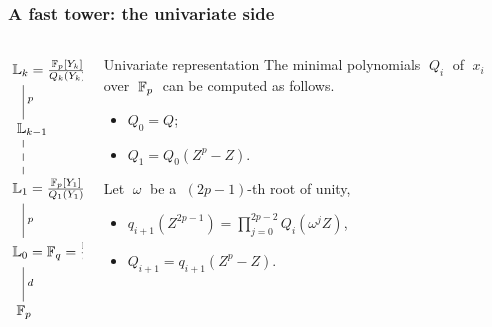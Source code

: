 \documentclass[10pt]{beamer}
\begin{document}
\begin{frame}
  \frametitle{A fast tower: the univariate side}

  \vspace{-2mm}

  \begin{columns}
    \begin{column}{0.3\textwidth}
      \Large$\xymatrix{
        *+[r]{\LK_k = \frac{\F_p[Y_k]}{Q_k(Y_k)}}\ar@{-}[d]^p\\
        *+[r]{\LK_{k-1}} \ar@{--}[d]\\
        *+[r]{\LK_1 = \frac{\F_p[Y_1]}{Q_1(Y_1)}} \ar@{-}[d]^p\\
        *+[r]{\LK_0 = \F_q = \frac{\F_p[X_0]}{Q(X_0)}} \ar@{-}[d]^d\\
        *+[r]{\F_p}
      }$    
    \end{column}
    \begin{column}{0.65\textwidth}
      \begin{block}{Univariate representation}
        The minimal polynomials $\;Q_i\;$ of $\;x_i\;$ over $\;\mathbb{F}_p\;$
        can be computed as follows.
        \begin{itemize}
        \item $Q_0 = Q$;
        \item $Q_1 = Q_0(Z^p-Z)$.
        \end{itemize}
        Let $\;\omega\;$ be a $\;(2p-1)$-th root of unity,
        \begin{itemize}
        \item $q_{i+1}(Z^{2p-1}) = \prod_{j=0}^{2p-2}Q_i(\omega^jZ)$,
        \item $Q_{i+1} = q_{i+1}(Z^p-Z)$.
        \end{itemize}
      \end{block}
    \end{column}
  \end{columns}
\end{frame}

\end{document}
